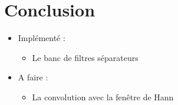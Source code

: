 \documentclass{beamer}
\begin{document}
 
 \section{Conclusion}
  \begin{frame}
       \tableofcontents[currentsection]
\end{frame}

 \begin{frame}
  \begin{itemize}
   \item Implémenté :
   \begin{itemize}
    \item<2-> Le banc de filtres séparateurs
   \end{itemize}
   \item<3-> A faire : 
    \begin{itemize}
      \item<5-> La convolution avec la fenêtre de Hann 
    \end{itemize}
  \end{itemize}

 \end{frame}
\end{document}
